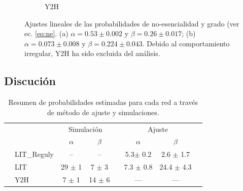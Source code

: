 \begin{figure}[!ht]
\begin{subfigure}[b]{0.4\columnwidth}
        \caption{\label{fig:y2h} Y2H}
    \end{subfigure}
    \caption{\label{fig:fit} Ajustes lineales de las probabilidades de no-esencialidad y grado (ver ec. \ref{eq:ne}. 
    (a) $\alpha = 0.53 \pm 0.002 $ y $\beta = 0.26 \pm 0.017$; (b) $\alpha = 0.073 \pm 0.008$ y $\beta = 0.224 \pm 0.043$. 
    Debido al comportamiento irregular, Y2H ha sido excluida del an\'alisis.}
\end{figure}





\subsection{Discuci\'on}
\begin{table}[!ht]
    \centering
    \caption{\label{tab:probas} Resumen de probabilidades estimadas para cada red a trav\'es de m\'etodo de ajuste
y simulaciones.}
    {\scriptsize
    \begin{tabularx}{.9\columnwidth}{XlccXccX}
        \hline\hline
        &               &  \multicolumn{2}{c}{Simulaci\'on}  &&  \multicolumn{2}{c}{Ajuste}          &      \\
        \cline{3-4} \cline{6-7}
        &               &   $\alpha$    & $\beta$        &&   $\alpha$       &       $\beta$     & \\
        \hline
        & LIT\_Reguly   & --         & --         && 5.3$ \pm$ 0.2  & 2.6 $\pm$ 1.7       &               \\
        & LIT           & 29 $\pm$ 1 & 7 $\pm$ 3  && 7.3 $\pm$ 0.8  & 24.4 $\pm$ 4.3       &               \\
        & Y2H           &  7 $\pm$ 1 & 14 $\pm$ 6 &&    ---             &   ---              &               \\
        \hline\hline
    \end{tabularx}
    }
\end{table}


